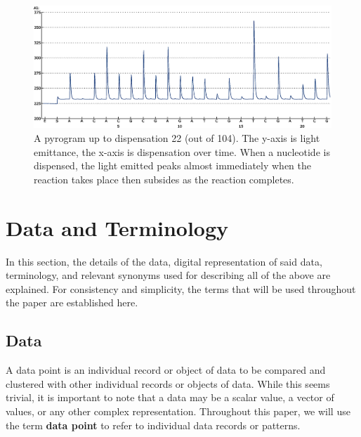\documentclass[12pt]{ucthesis}
\begin{document}
      \begin{figure}[t]
      \centering
      \includegraphics[width=\columnwidth]{graphics/pyrogram.eps}
      \caption{A pyrogram up to dispensation 22 (out of 104). The y-axis is
      light emittance, the x-axis is dispensation over time. When a nucleotide
      is dispensed, the light emitted peaks almost immediately when the
      reaction takes place then subsides as the reaction completes.}
      \label{fig:pyrogram}
      \end{figure}

   \section{Data and Terminology}\label{sec:data_and_terms}
      In this section, the details of the data, digital representation of said
      data, terminology, and relevant synonyms used for describing all of the
      above are explained. For consistency and simplicity, the terms that will
      be used throughout the paper are established here.

      \subsection{Data}
      A data point is an individual record or object of data to be compared
      and clustered with other individual records or objects of data. While
      this seems trivial, it is important to note that a data may be a scalar
      value, a vector of values, or any other complex representation.
      Throughout this paper, we will use the term \textbf{data point} to refer
      to individual data records or patterns.
\end{document}
